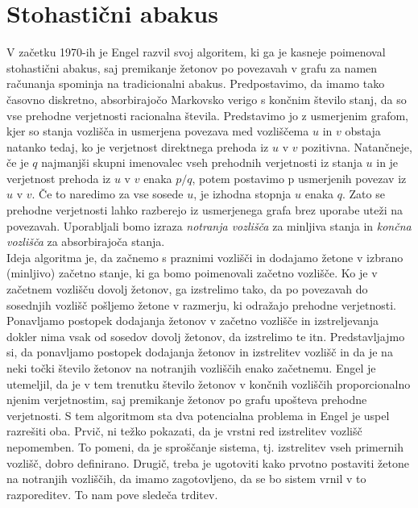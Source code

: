 \documentclass[twoside,11pt]{article}
\begin{document}
\section{Stohastični abakus}
V začetku 1970-ih je Engel razvil svoj algoritem, ki ga je kasneje poimenoval stohastični abakus, saj premikanje žetonov po povezavah v grafu za namen računanja spominja na tradicionalni abakus.
\indent Predpostavimo, da imamo tako časovno diskretno, absorbirajočo Markovsko verigo s končnim število stanj, da so vse prehodne verjetnosti racionalna števila. Predstavimo jo z usmerjenim grafom, kjer so stanja vozlišča in usmerjena povezava med vozliščema $u$ in $v$ obstaja natanko tedaj, ko je verjetnost direktnega prehoda iz $u$ v $v$ pozitivna. 
Natančneje, če je $q$ najmanjši skupni imenovalec vseh prehodnih verjetnosti iz stanja $u$ in je verjetnost prehoda iz $u$ v $v$ enaka $p/q$, potem postavimo p usmerjenih povezav iz $u$ v $v$. Če to naredimo za vse sosede $u$, je izhodna stopnja $u$ enaka $q$. Zato se prehodne verjetnosti lahko razberejo iz usmerjenega grafa brez uporabe uteži na povezavah. 
Uporabljali bomo izraza \emph{notranja vozlišča} za minljiva stanja in \emph{končna vozlišča} za absorbirajoča stanja. \\
\indent Ideja algoritma je, da začnemo s praznimi vozlišči in dodajamo žetone v izbrano (minljivo) začetno stanje, ki ga bomo poimenovali začetno vozlišče. Ko je v začetnem vozlišču dovolj žetonov, ga izstrelimo tako, da po povezavah do sosednjih vozlišč pošljemo žetone v razmerju, ki odražajo prehodne verjetnosti. Ponavljamo postopek dodajanja žetonov v začetno vozlišče in izstreljevanja dokler nima vsak od sosedov dovolj žetonov, da izstrelimo te itn. Predstavljajmo si, da ponavljamo postopek dodajanja žetonov in izstrelitev vozlišč in
da je na neki točki število žetonov na notranjih vozliščih enako začetnemu. Engel je utemeljil, da je v tem trenutku število žetonov v končnih vozliščih proporcionalno njenim verjetnostim, saj premikanje žetonov po grafu upošteva prehodne verjetnosti. %
\newline 
\indent S tem algoritmom sta dva potencialna problema in Engel je uspel razrešiti oba. Prvič, ni težko pokazati, da je vrstni red izstrelitev vozlišč nepomemben. To pomeni, da je sproščanje sistema, tj. izstrelitev vseh primernih vozlišč, dobro definirano. Drugič, treba je ugotoviti kako prvotno postaviti žetone na notranjih vozliščih, da imamo zagotovljeno, da se bo sistem vrnil v to razporeditev. To nam pove sledeča trditev.  
\end{document}
